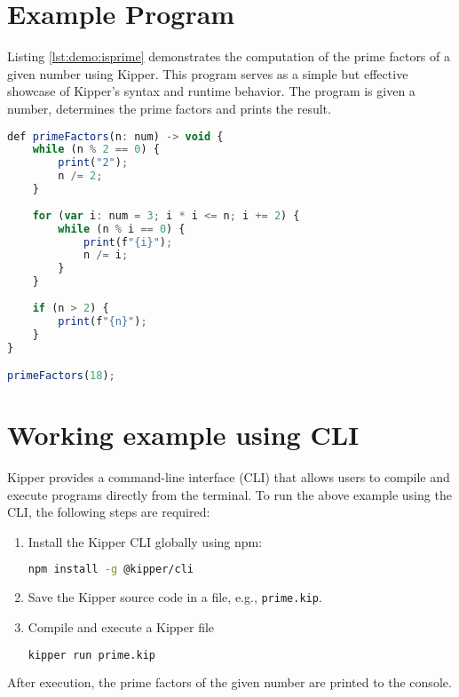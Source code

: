 \section{Example Program}

Listing \ref{lst:demo:isprime} demonstrates the computation of the prime factors of a given number using Kipper. This program serves as a simple but effective showcase of Kipper's syntax and runtime behavior. The program is given a number, determines the prime factors and prints the result.

\begin{lstlisting}[language=Typescript,caption=A basic programs that determines the prime factors of an integer, label=lst:demo:isprime]
def primeFactors(n: num) -> void {
	while (n % 2 == 0) {
		print("2");
		n /= 2;
	}
	
	for (var i: num = 3; i * i <= n; i += 2) {
		while (n % i == 0) {
			print(f"{i}");
			n /= i;
		}
	}
	
	if (n > 2) {
		print(f"{n}");
	}
}

primeFactors(18);
\end{lstlisting}

\section{Working example using CLI}
Kipper provides a command-line interface (CLI) that allows users to compile and execute programs directly from the terminal. To run the above example using the CLI, the following steps are required:

\begin{enumerate}
	\item Install the Kipper CLI globally using npm:
	\begin{lstlisting}[language=Bash,caption=Installing the Kipper CLI globally]
		npm install -g @kipper/cli
	\end{lstlisting}
	
	\item Save the Kipper source code in a file, e.g., \texttt{prime.kip}.
	
	\item Compile and execute a Kipper file
	\begin{lstlisting}[language=Bash,caption=The Kipper run command]
		kipper run prime.kip
	\end{lstlisting}
\end{enumerate}

After execution, the prime factors of the given number are printed to the console.


